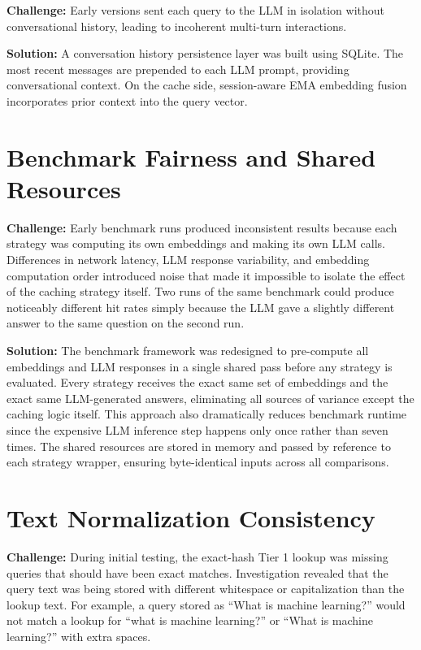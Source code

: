 \documentclass[12pt,a4paper]{report}
\begin{document}
\textbf{Challenge:} Early versions sent each query to the LLM in isolation without conversational history, leading to incoherent multi-turn interactions.

\textbf{Solution:} A conversation history persistence layer was built using SQLite. The most recent messages are prepended to each LLM prompt, providing conversational context. On the cache side, session-aware EMA embedding fusion incorporates prior context into the query vector.

\section{Benchmark Fairness and Shared Resources}

\textbf{Challenge:} Early benchmark runs produced inconsistent results because each strategy was computing its own embeddings and making its own LLM calls. Differences in network latency, LLM response variability, and embedding computation order introduced noise that made it impossible to isolate the effect of the caching strategy itself. Two runs of the same benchmark could produce noticeably different hit rates simply because the LLM gave a slightly different answer to the same question on the second run.

\textbf{Solution:} The benchmark framework was redesigned to pre-compute all embeddings and LLM responses in a single shared pass before any strategy is evaluated. Every strategy receives the exact same set of embeddings and the exact same LLM-generated answers, eliminating all sources of variance except the caching logic itself. This approach also dramatically reduces benchmark runtime since the expensive LLM inference step happens only once rather than seven times. The shared resources are stored in memory and passed by reference to each strategy wrapper, ensuring byte-identical inputs across all comparisons.

\section{Text Normalization Consistency}

\textbf{Challenge:} During initial testing, the exact-hash Tier 1 lookup was missing queries that should have been exact matches. Investigation revealed that the query text was being stored with different whitespace or capitalization than the lookup text. For example, a query stored as ``What is machine learning?'' would not match a lookup for ``what is machine learning?'' or ``What  is  machine  learning?'' with extra spaces.
\end{document}
